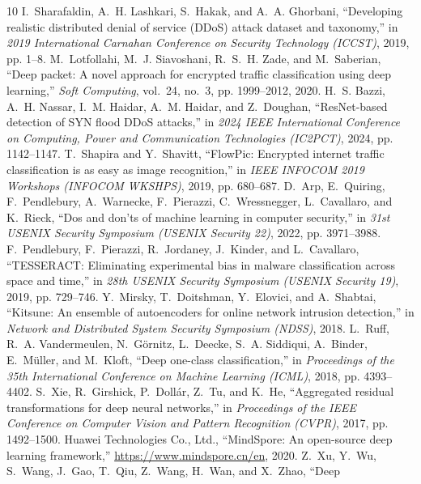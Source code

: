 \documentclass[conference]{IEEEtran} \IEEEoverridecommandlockouts
\begin{document}
\begin{thebibliography}{10}
I.~Sharafaldin, A.~H. Lashkari, S.~Hakak, and A.~A. Ghorbani, ``Developing
  realistic distributed denial of service ({DDoS}) attack dataset and
  taxonomy,'' in \emph{2019 International Carnahan Conference on Security
  Technology (ICCST)}, 2019, pp. 1--8.
M.~Lotfollahi, M.~J. Siavoshani, R.~S.~H. Zade, and M.~Saberian, ``Deep packet:
  A novel approach for encrypted traffic classification using deep learning,''
  \emph{Soft Computing}, vol.~24, no.~3, pp. 1999--2012, 2020.
H.~S. Bazzi, A.~H. Nassar, I.~M. Haidar, A.~M. Haidar, and Z.~Doughan,
  ``{ResNet}-based detection of {SYN} flood {DDoS} attacks,'' in \emph{2024
  IEEE International Conference on Computing, Power and Communication
  Technologies (IC2PCT)}, 2024, pp. 1142--1147.
T.~Shapira and Y.~Shavitt, ``{FlowPic}: Encrypted internet traffic
  classification is as easy as image recognition,'' in \emph{IEEE INFOCOM 2019
  Workshops (INFOCOM WKSHPS)}, 2019, pp. 680--687.
D.~Arp, E.~Quiring, F.~Pendlebury, A.~Warnecke, F.~Pierazzi, C.~Wressnegger,
  L.~Cavallaro, and K.~Rieck, ``Dos and don'ts of machine learning in computer
  security,'' in \emph{31st USENIX Security Symposium (USENIX Security 22)},
  2022, pp. 3971--3988.
F.~Pendlebury, F.~Pierazzi, R.~Jordaney, J.~Kinder, and L.~Cavallaro,
  ``{TESSERACT}: Eliminating experimental bias in malware classification across
  space and time,'' in \emph{28th USENIX Security Symposium (USENIX Security
  19)}, 2019, pp. 729--746.
Y.~Mirsky, T.~Doitshman, Y.~Elovici, and A.~Shabtai, ``Kitsune: An ensemble of
  autoencoders for online network intrusion detection,'' in \emph{Network and
  Distributed System Security Symposium (NDSS)}, 2018.
L.~Ruff, R.~A. Vandermeulen, N.~G{\"o}rnitz, L.~Deecke, S.~A. Siddiqui,
  A.~Binder, E.~M{\"u}ller, and M.~Kloft, ``Deep one-class classification,'' in
  \emph{Proceedings of the 35th International Conference on Machine Learning
  (ICML)}, 2018, pp. 4393--4402.
S.~Xie, R.~Girshick, P.~Doll{\'a}r, Z.~Tu, and K.~He, ``Aggregated residual
  transformations for deep neural networks,'' in \emph{Proceedings of the IEEE
  Conference on Computer Vision and Pattern Recognition (CVPR)}, 2017, pp.
  1492--1500.
{Huawei Technologies Co., Ltd.}, ``{MindSpore}: An open-source deep learning
  framework,'' \url{https://www.mindspore.cn/en}, 2020.
Z.~Xu, Y.~Wu, S.~Wang, J.~Gao, T.~Qiu, Z.~Wang, H.~Wan, and X.~Zhao, ``Deep

\end{thebibliography}
\end{document}
